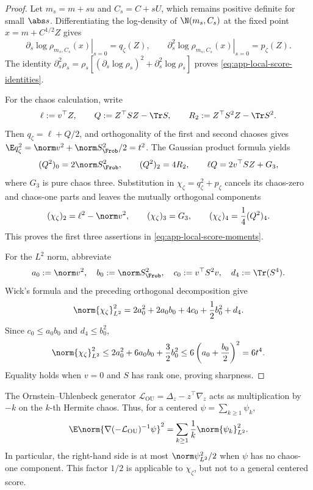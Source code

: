 \begin{proof}
Let \(m_s=m+su\) and \(C_s=C+sU\), which remains positive definite for
small \(\abs s\).  Differentiating the log-density of
\(\N(m_s,C_s)\) at the fixed point \(x=m+C^{1/2}Z\) gives
\[
  \left.\partial_s\log\rho_{m_s,C_s}(x)\right|_{s=0}=q_\zeta(Z),
  \qquad
  \left.\partial_s^2\log\rho_{m_s,C_s}(x)\right|_{s=0}=p_\zeta(Z).
\]
The identity
\(\partial_s^2\rho_s=\rho_s[(\partial_s\log\rho_s)^2+
\partial_s^2\log\rho_s]\) proves
\eqref{eq:app-local-score-identities}.

For the chaos calculation, write
\[
  \ell:=v^\top Z,\qquad
  Q:=Z^\top SZ-\Tr S,\qquad
  R_2:=Z^\top S^2Z-\Tr S^2.
\]
Then \(q_\zeta=\ell+Q/2\), and orthogonality of the first and second
chaoses gives
\(\E q_\zeta^2=\norm v^2+\norm S_{\Frob}^2/2=t^2\).
The Gaussian product formula yields
\[
  (Q^2)_0=2\norm S_{\Frob}^2,\qquad
  (Q^2)_2=4R_2,\qquad
  \ell Q=2v^\top SZ+G_3,
\]
where \(G_3\) is pure chaos three.  Substitution in
\(\chi_\zeta=q_\zeta^2+p_\zeta\) cancels its chaos-zero and chaos-one
parts and leaves the mutually orthogonal components
\[
  (\chi_\zeta)_2=\ell^2-\norm v^2,\qquad
  (\chi_\zeta)_3=G_3,\qquad
  (\chi_\zeta)_4=\frac14(Q^2)_4.
\]
This proves the first three assertions in
\eqref{eq:app-local-score-moments}.

For the \(L^2\) norm, abbreviate
\[
  a_0:=\norm v^2,\quad
  b_0:=\norm S_{\Frob}^2,\quad
  c_0:=v^\top S^2v,\quad
  d_4:=\Tr(S^4).
\]
Wick's formula and the preceding orthogonal decomposition give
\begin{equation}
  \norm{\chi_\zeta}_{L^2}^2
  =
  2a_0^2+2a_0b_0+4c_0+\frac12b_0^2+d_4.
  \label{eq:app-local-score-exact-L2}
\end{equation}
Since \(c_0\leq a_0b_0\) and \(d_4\leq b_0^2\),
\[
  \norm{\chi_\zeta}_{L^2}^2
  \leq
  2a_0^2+6a_0b_0+\frac32b_0^2
  \leq6\left(a_0+\frac{b_0}{2}\right)^2
  =6t^4.
\]
Equality holds when \(v=0\) and \(S\) has rank one, proving sharpness.
\end{proof}

The Ornstein--Uhlenbeck generator
\(\mathcal L_{\mathrm{OU}}=\Delta_z-z^\top\nabla_z\) acts as multiplication
by \(-k\) on the \(k\)-th Hermite chaos.  Thus, for a centered
\(\psi=\sum_{k\geq1}\psi_k\),
\begin{equation}
  \E\norm{\nabla(-\mathcal L_{\mathrm{OU}})^{-1}\psi}^2
  =
  \sum_{k\geq1}\frac1k\norm{\psi_k}_{L^2}^2.
  \label{eq:app-local-OU-inverse}
\end{equation}
In particular, the right-hand side is at most
\(\norm\psi_{L^2}^2/2\) when \(\psi\) has no chaos-one component.  This
factor \(1/2\) is applicable to \(\chi_\zeta\), but not to a general
centered score.

